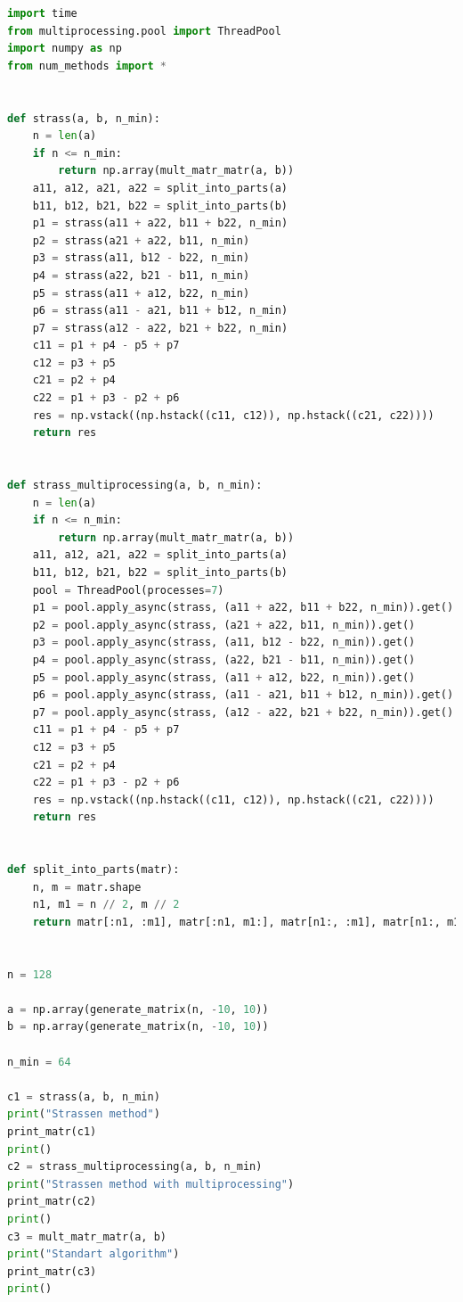 \documentclass[a4paper, 14pt]{extarticle}
\begin{document}
\begin{lstlisting}[language={python},caption={Метод Штрассена},label={lst:code1}]
import time
from multiprocessing.pool import ThreadPool
import numpy as np
from num_methods import *


def strass(a, b, n_min):
    n = len(a)
    if n <= n_min:
        return np.array(mult_matr_matr(a, b))
    a11, a12, a21, a22 = split_into_parts(a)
    b11, b12, b21, b22 = split_into_parts(b)
    p1 = strass(a11 + a22, b11 + b22, n_min)
    p2 = strass(a21 + a22, b11, n_min)
    p3 = strass(a11, b12 - b22, n_min)
    p4 = strass(a22, b21 - b11, n_min)
    p5 = strass(a11 + a12, b22, n_min)
    p6 = strass(a11 - a21, b11 + b12, n_min)
    p7 = strass(a12 - a22, b21 + b22, n_min)
    c11 = p1 + p4 - p5 + p7
    c12 = p3 + p5
    c21 = p2 + p4
    c22 = p1 + p3 - p2 + p6
    res = np.vstack((np.hstack((c11, c12)), np.hstack((c21, c22))))
    return res


def strass_multiprocessing(a, b, n_min):
    n = len(a)
    if n <= n_min:
        return np.array(mult_matr_matr(a, b))
    a11, a12, a21, a22 = split_into_parts(a)
    b11, b12, b21, b22 = split_into_parts(b)
    pool = ThreadPool(processes=7)
    p1 = pool.apply_async(strass, (a11 + a22, b11 + b22, n_min)).get()
    p2 = pool.apply_async(strass, (a21 + a22, b11, n_min)).get()
    p3 = pool.apply_async(strass, (a11, b12 - b22, n_min)).get()
    p4 = pool.apply_async(strass, (a22, b21 - b11, n_min)).get()
    p5 = pool.apply_async(strass, (a11 + a12, b22, n_min)).get()
    p6 = pool.apply_async(strass, (a11 - a21, b11 + b12, n_min)).get()
    p7 = pool.apply_async(strass, (a12 - a22, b21 + b22, n_min)).get()
    c11 = p1 + p4 - p5 + p7
    c12 = p3 + p5
    c21 = p2 + p4
    c22 = p1 + p3 - p2 + p6
    res = np.vstack((np.hstack((c11, c12)), np.hstack((c21, c22))))
    return res


def split_into_parts(matr):
    n, m = matr.shape
    n1, m1 = n // 2, m // 2
    return matr[:n1, :m1], matr[:n1, m1:], matr[n1:, :m1], matr[n1:, m1:]


n = 128

a = np.array(generate_matrix(n, -10, 10))
b = np.array(generate_matrix(n, -10, 10))

n_min = 64

c1 = strass(a, b, n_min)
print("Strassen method")
print_matr(c1)
print()
c2 = strass_multiprocessing(a, b, n_min)
print("Strassen method with multiprocessing")
print_matr(c2)
print()
c3 = mult_matr_matr(a, b)
print("Standart algorithm")
print_matr(c3)
print()


\end{lstlisting}
\end{document}
